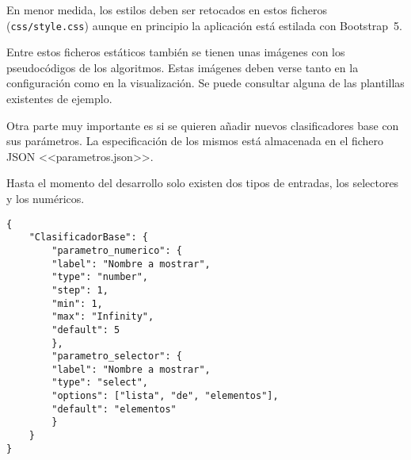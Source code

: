 \begin{figure}[H]
\end{figure}

En menor medida, los estilos deben ser retocados en estos ficheros
(\texttt{css/style.css}) aunque en principio la aplicación está estilada con
Bootstrap~5.

Entre estos ficheros estáticos también se tienen unas imágenes con los
pseudocódigos de los algoritmos. Estas imágenes deben verse tanto en la
configuración como en la visualización. Se puede consultar alguna de las
plantillas existentes de ejemplo.

Otra parte muy importante es si se quieren añadir nuevos clasificadores base con
sus parámetros. La especificación de los mismos está almacenada en el fichero
JSON <<parametros.json>>. 

Hasta el momento del desarrollo solo existen dos tipos de entradas, los
selectores y los numéricos.

\begin{tcolorbox}[colback=cyan!5!white,colframe=cyan!75!black,title=Estructura para añadir clasificadores y sus parámetros]
\begin{verbatim}
{
    "ClasificadorBase": {
        "parametro_numerico": {
        "label": "Nombre a mostrar",
        "type": "number",
        "step": 1,
        "min": 1,
        "max": "Infinity",
        "default": 5
        },
        "parametro_selector": {
        "label": "Nombre a mostrar",
        "type": "select",
        "options": ["lista", "de", "elementos"],
        "default": "elementos"
        }
    }
}
\end{verbatim}
\end{tcolorbox}

